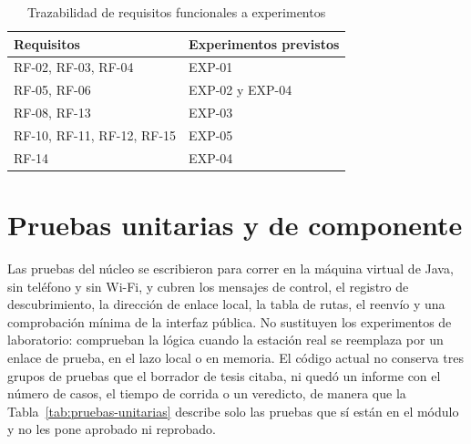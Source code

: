 \documentclass[12pt,oneside]{scrreprt}
\begin{document}
\begin{table}[H]
\centering
\singlespacing
\caption{Trazabilidad de requisitos funcionales a experimentos}
\label{tab:trazabilidad-rf-exp}
\renewcommand{\arraystretch}{1.1}
\begin{tabularx}{\textwidth}{@{} l X @{}}
\toprule
\textbf{Requisitos} & \textbf{Experimentos previstos} \\
\midrule
RF-02, RF-03, RF-04 & EXP-01 \\
RF-05, RF-06 & EXP-02 y EXP-04 \\
RF-08, RF-13 & EXP-03 \\
RF-10, RF-11, RF-12, RF-15 & EXP-05 \\
RF-14 & EXP-04 \\
\bottomrule
\end{tabularx}
\end{table}

\section{Pruebas unitarias y de componente}

Las pruebas del núcleo se escribieron para correr en la máquina virtual de Java, sin teléfono y sin Wi-Fi, y cubren los mensajes de control, el registro de descubrimiento, la dirección de enlace local, la tabla de rutas, el reenvío y una comprobación mínima de la interfaz pública. No sustituyen los experimentos de laboratorio: comprueban la lógica cuando la estación real se reemplaza por un enlace de prueba, en el lazo local o en memoria. El código actual no conserva tres grupos de pruebas que el borrador de tesis citaba, ni quedó un informe con el número de casos, el tiempo de corrida o un veredicto, de manera que la Tabla~\ref{tab:pruebas-unitarias} describe solo las pruebas que sí están en el módulo y no les pone aprobado ni reprobado.
\end{document}
